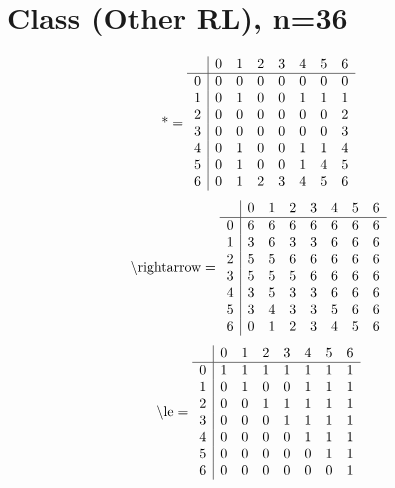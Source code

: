 \documentclass[11pt]{article}
\begin{document}
\section{Class (Other RL), n=36}
\[\text{*} = 
\begin{array}{r | r r r r r r r}
 & 0 & 1 & 2 & 3 & 4 & 5 & 6 \\ \hline
0 & 0 & 0 & 0 & 0 & 0 & 0 & 0 \\
1 & 0 & 1 & 0 & 0 & 1 & 1 & 1 \\
2 & 0 & 0 & 0 & 0 & 0 & 0 & 2 \\
3 & 0 & 0 & 0 & 0 & 0 & 0 & 3 \\
4 & 0 & 1 & 0 & 0 & 1 & 1 & 4 \\
5 & 0 & 1 & 0 & 0 & 1 & 4 & 5 \\
6 & 0 & 1 & 2 & 3 & 4 & 5 & 6 \\
\end{array}
\]
\[\text{\textbackslash rightarrow} = 
\begin{array}{r | r r r r r r r}
 & 0 & 1 & 2 & 3 & 4 & 5 & 6 \\ \hline
0 & 6 & 6 & 6 & 6 & 6 & 6 & 6 \\
1 & 3 & 6 & 3 & 3 & 6 & 6 & 6 \\
2 & 5 & 5 & 6 & 6 & 6 & 6 & 6 \\
3 & 5 & 5 & 5 & 6 & 6 & 6 & 6 \\
4 & 3 & 5 & 3 & 3 & 6 & 6 & 6 \\
5 & 3 & 4 & 3 & 3 & 5 & 6 & 6 \\
6 & 0 & 1 & 2 & 3 & 4 & 5 & 6 \\
\end{array}
\]
\[\text{\textbackslash le} = 
\begin{array}{r | r r r r r r r}
 & 0 & 1 & 2 & 3 & 4 & 5 & 6 \\ \hline
0 & 1 & 1 & 1 & 1 & 1 & 1 & 1 \\
1 & 0 & 1 & 0 & 0 & 1 & 1 & 1 \\
2 & 0 & 0 & 1 & 1 & 1 & 1 & 1 \\
3 & 0 & 0 & 0 & 1 & 1 & 1 & 1 \\
4 & 0 & 0 & 0 & 0 & 1 & 1 & 1 \\
5 & 0 & 0 & 0 & 0 & 0 & 1 & 1 \\
6 & 0 & 0 & 0 & 0 & 0 & 0 & 1 \\
\end{array}
\]
\end{document}

